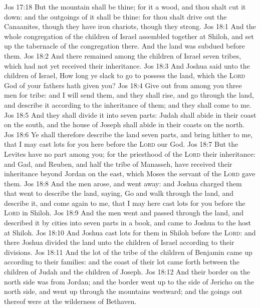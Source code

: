 \vs Jos 17:18 But the mountain shall be thine; for it  a wood, and thou shalt cut it down: and the outgoings of it shall be thine: for thou shalt drive out the Canaanites, though they have iron chariots,  though they  strong.
\vs Jos 18:1 And the whole congregation of the children of Israel assembled together at Shiloh, and set up the tabernacle of the congregation there. And the land was subdued before them.
\vs Jos 18:2 And there remained among the children of Israel seven tribes, which had not yet received their inheritance.
\vs Jos 18:3 And Joshua said unto the children of Israel, How long  ye slack to go to possess the land, which the \textsc{Lord} God of your fathers hath given you?
\vs Jos 18:4 Give out from among you three men for  tribe: and I will send them, and they shall rise, and go through the land, and describe it according to the inheritance of them; and they shall come  to me.
\vs Jos 18:5 And they shall divide it into seven parts: Judah shall abide in their coast on the south, and the house of Joseph shall abide in their coasts on the north.
\vs Jos 18:6 Ye shall therefore describe the land  seven parts, and bring  hither to me, that I may cast lots for you here before the \textsc{Lord} our God.
\vs Jos 18:7 But the Levites have no part among you; for the priesthood of the \textsc{Lord}  their inheritance: and Gad, and Reuben, and half the tribe of Manasseh, have received their inheritance beyond Jordan on the east, which Moses the servant of the \textsc{Lord} gave them.
\vs Jos 18:8 And the men arose, and went away: and Joshua charged them that went to describe the land, saying, Go and walk through the land, and describe it, and come again to me, that I may here cast lots for you before the \textsc{Lord} in Shiloh.
\vs Jos 18:9 And the men went and passed through the land, and described it by cities into seven parts in a book, and came  to Joshua to the host at Shiloh.
\vs Jos 18:10 And Joshua cast lots for them in Shiloh before the \textsc{Lord}: and there Joshua divided the land unto the children of Israel according to their divisions.
\vs Jos 18:11 And the lot of the tribe of the children of Benjamin came up according to their families: and the coast of their lot came forth between the children of Judah and the children of Joseph.
\vs Jos 18:12 And their border on the north side was from Jordan; and the border went up to the side of Jericho on the north side, and went up through the mountains westward; and the goings out thereof were at the wilderness of Bethaven.
